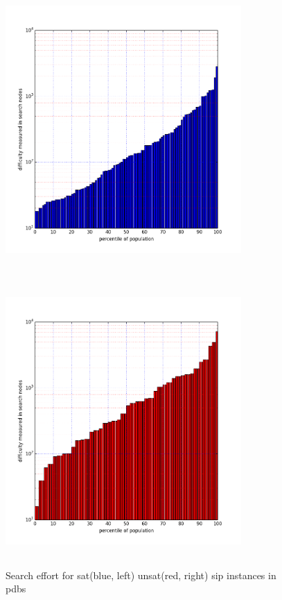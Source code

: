 \documentclass{l4proj}
\begin{document}
\begin{figure}
\centering
\begin{minipage}[t]{.5\textwidth}
  \centering
  \includegraphics[height=11cm,width=9cm]{images/plots/pdbsSAT.png}
\end{minipage}%
\begin{minipage}[t]{.5\textwidth}
  \centering
  \includegraphics[height=11cm,width=9cm]{images/plots/pdbsUNSAT.png}
\end{minipage}
\caption{Search effort for \gls{sat}(blue, left) \gls{unsat}(red, right) \gls{sip} instances in pdbs}
\label{fig:pdbsSatUnsat}
\end{figure}
\end{document}
